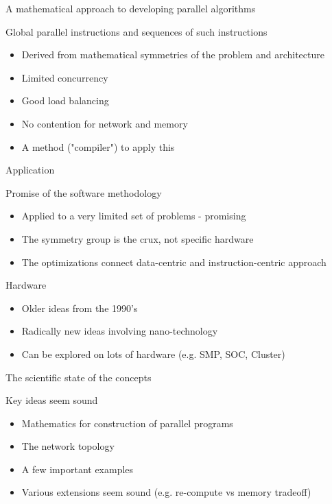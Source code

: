 \documentclass{beamer}
\begin{document}
\begin{frame}{A mathematical approach to developing parallel algorithms}
\begin{block}{
Global parallel instructions and sequences of such instructions}
\begin{itemize}
\item Derived from mathematical symmetries of the problem and architecture
\item Limited concurrency
\item Good load balancing
\item No contention for network and memory 
\item A method ("compiler") to apply this
\end{itemize}
\end{block}
\end{frame}

\begin{frame}{Application}

\begin{block}{Promise of the software methodology}
\begin{itemize}
\item Applied to a very limited set of problems - promising
\item The symmetry group is the crux, not specific hardware
\item The optimizations connect data-centric and instruction-centric approach
\end{itemize}
\end{block}
\begin{block}{Hardware}
\begin{itemize}
\item Older ideas from the 1990's
\item Radically new ideas involving nano-technology
\item Can be explored on lots of hardware (e.g. SMP, SOC, Cluster)
\end{itemize}
\end{block}
\end{frame}

\begin{frame}{The scientific state of the concepts}

\begin{block}{Key ideas seem sound}
\begin{itemize}
\item Mathematics for construction of parallel programs
\item The network topology
\item A few important examples
\item Various extensions seem sound (e.g. re-compute vs memory tradeoff)
\end{itemize}
\end{block}
\end{frame}
\end{document}

